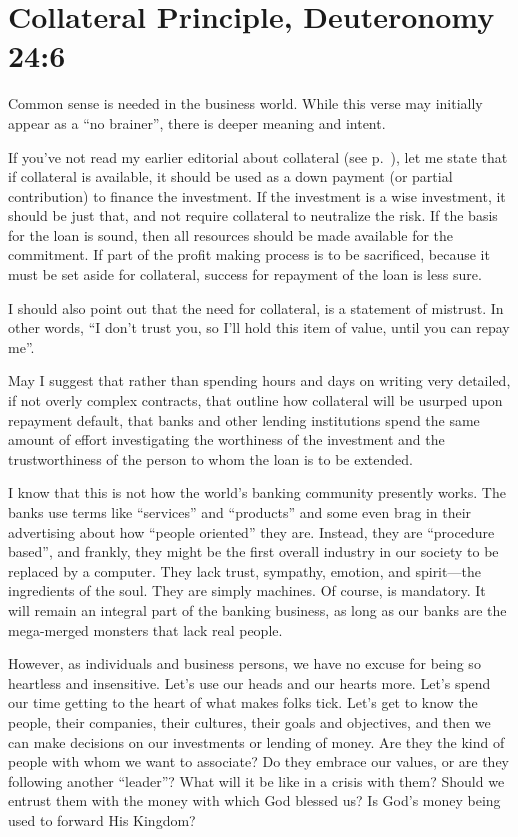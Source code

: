 \documentclass[12pt]{memoir}
\begin{document}
\section[Collateral Principle]{Collateral Principle, Deuteronomy 24:6}

Common sense is needed in the business world. While this verse may initially appear as a ``no brainer'', there is deeper meaning and intent.

If you've not read my earlier editorial about collateral (see p.\ \pageref{collateral_1}), let me state that if collateral is available, it should be used as a down payment (or partial contribution) to finance the investment. If the investment is a wise investment, it should be just that, and not require collateral to neutralize the risk. If the basis for the loan is sound, then all resources should be made available for the commitment. If part of the profit making process is to be sacrificed, because it must be set aside for collateral, success for repayment of the loan is less sure. 

I should also point out that the need for collateral, is a statement of mistrust. In other words, ``I don't trust you, so I'll hold this item of value, until you can repay me''.

May I suggest that rather than spending hours and days on writing very detailed, if not overly complex contracts, that outline how collateral will be usurped upon repayment default, that banks and other lending institutions spend the same amount of effort investigating the worthiness of the investment and the trustworthiness of the person to whom the loan is to be extended.

I know that this is not how the world's banking community presently works. The banks use terms like ``services'' and ``products'' and some even brag in their advertising about how ``people oriented'' they are. Instead, they are ``procedure based'', and frankly, they might be the first overall industry in our society to be replaced by a computer. They lack trust, sympathy, emotion, and spirit---the ingredients of the soul. They are simply machines. Of course, is mandatory. It will remain an integral part of the banking business, as long as our banks are the mega-merged monsters that lack
real people.

However, as individuals and business persons, we have no excuse for being so heartless and insensitive. Let's use our heads and our hearts more. Let's spend our time getting to the heart of what makes folks tick. Let's get to know the people, their companies, their cultures, their goals and objectives, and then we can make decisions on our investments or lending of money. Are they the kind of people with whom we want to associate? Do they embrace our values, or are they following another ``leader''? What will it be like in a crisis with
them? Should we entrust them with the money with which God blessed us? Is God's money being used to forward His Kingdom?
\end{document}

